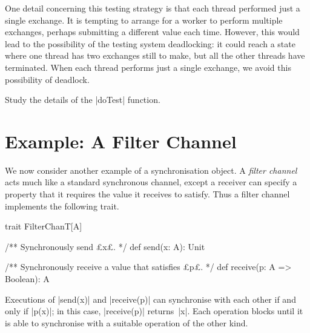 One detail concerning this testing strategy is that each thread performed just
a single exchange.  It is tempting to arrange for a worker to perform multiple
exchanges, perhaps submitting a different value each time.  However, this would
lead to the possibility of the testing system deadlocking: it could reach a
state where one thread has two exchanges still to make, but all the other
threads have terminated.  When each thread performs just a single exchange, we
avoid this possibility of deadlock. 

\begin{instruction}
Study the details of the |doTest| function.
\end{instruction}


\section{Example: A Filter Channel}
\label{sec:filter-chan}

We now consider another example of a synchronisation object.  A \emph{filter
  channel} acts much like a standard synchronous
channel, except a receiver can specify a property that it requires the value
it receives to satisfy.  Thus a filter channel implements the following trait.
%
\begin{scala}
trait FilterChanT[A]{
  /** Synchronously send £x£. */
  def send(x: A): Unit

  /** Synchronously receive a value that satisfies £p£. */
  def receive(p: A => Boolean): A 
}
\end{scala}
%
Executions of |send(x)| and |receive(p)| can synchronise with each other
if and only if |p(x)|; in this case, |receive(p)| returns~|x|.  Each operation
blocks until it is able to synchronise with a suitable operation of the other
kind. 


